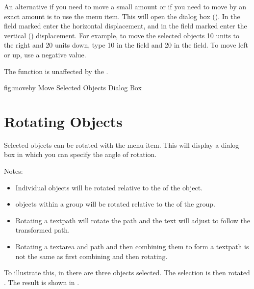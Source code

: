 
An alternative if you need to move a small amount or if you need to
move by an exact amount is to use the  menu item.
This will open the  dialog box ().
In the field marked  enter the horizontal
displacement, and in the field marked 
enter the vertical () displacement. For example, to move the
selected \glspl*{object} 10 units to the right and 20 units down,
type 10 in the  field and 20 in the
 field. To move left or up, use a negative
value.

\begin{information}
The  function is unaffected by the \gridlock.
\end{information}

\FloatFig
  {fig:moveby}
  {}
  {Move Selected Objects Dialog Box}


\section{Rotating Objects}\label{sec:rotateobjects}


Selected \glspl{object} can be rotated with the
 menu item. This will display a dialog box in
which you can specify the angle of rotation.

Notes:
\begin{itemize}
\item Individual \glspl{object}
will be rotated relative to the  of the \gls{object}.

\item \Glspl*{object} within a
\gls{group} will be rotated relative to the  of the
group.

\item Rotating a \gls{textpath} will rotate the path and the text
will adjust to follow the transformed path.

\item Rotating a \gls*{textarea} and \gls*{path} and then combining
them to form a \gls*{textpath} is not the same as first combining
and then rotating.

\end{itemize}

To illustrate this, in  there are three
\glspl*{object} selected.  The selection is then rotated
.  The result is shown in .

